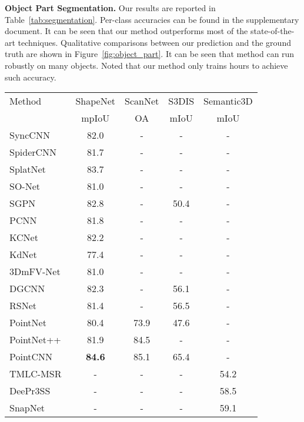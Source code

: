 \documentclass[10pt,twocolumn,letterpaper]{article}
\begin{document}
\noindent \textbf{Object Part Segmentation.}
Our results are reported in Table~\ref{tab:segmentation}. Per-class accuracies can be found in the supplementary document. It can be seen that our method outperforms most of the state-of-the-art techniques. Qualitative comparisons between our prediction and the ground truth are shown in Figure~\ref{fig:object_part}. It can be seen that \ournet method can run robustly on many objects. Noted that our method only trains  hours to achieve such accuracy.
\begin{table}[t]
	\begin{center}
	\footnotesize
	\begin{tabular}{l c|c|c|c}
		\toprule
		Method   & ShapeNet & ScanNet & S3DIS  & Semantic3D \\
		         & mpIoU    & OA      & mIoU   & mIoU \\
		\midrule
		SyncCNN \cite{yi2017syncspeccnn}     & 82.0   & - & - & -\\
		SpiderCNN \cite{xu2018spidercnn}     & 81.7   & - & - & -\\
		SplatNet \cite{su18splatnet}     & 83.7   & - & - & -\\
		SO-Net \cite{li2018sonet}     & 81.0   & -   & - & -\\
		SGPN \cite{wang2018sgpn}     & 82.8   & - & 50.4 & -\\
		PCNN \cite{atzmon2018point}     & 81.8   & -  & - & -\\
		KCNet \cite{shen2018mining}     & 82.2   & -    & - & -\\
		KdNet \cite{klokov2017escape}     & 77.4   & - & - & -\\
		3DmFV-Net \cite{shabat20183dmfv} & 81.0  & - & - & -\\
		DGCNN \cite{wang2018edgeconv}     & 82.3   & - & 56.1 & -\\
		RSNet \cite{huang2018recurrent}     & 81.4   & - & 56.5 & -\\
		PointNet \cite{qi2017pointnet}     & 80.4   & 73.9 & 47.6 & -\\
		PointNet++ \cite{qi2017pointnet++} & 81.9   & 84.5     & -  & -\\
		PointCNN \cite{li2018pointcnn}     & \textbf{84.6}   & 85.1 & 65.4   & -\\
		TMLC-MSR~\cite{hackel2016fast}     & -   & - & -  & 54.2 \\
		DeePr3SS~\cite{lawin2017deep}      & -   & - & -  & 58.5 \\
		SnapNet~\cite{boulch2017unstructured}  & -   & - & -  & 59.1\\

\end{tabular}
\end{center}
\end{table}
\end{document}
